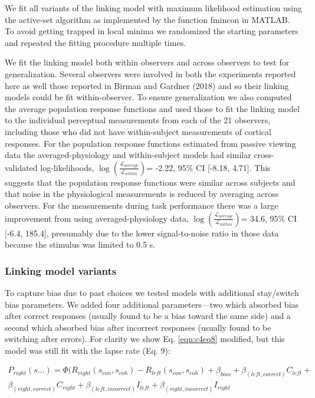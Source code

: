 \documentclass{report}
\begin{document}
We fit all variants of the linking model with maximum likelihood estimation using the active-set algorithm as implemented by the function fmincon in MATLAB. To avoid getting trapped in local minima we randomized the starting parameters and repeated the fitting procedure multiple times. 

We fit the linking model both within observers and across observers to test for generalization. Several observers were involved in both the experiments reported here as well those reported in Birman and Gardner (2018) and so their linking models could be fit within-observer. To ensure generalization we also computed the average population response functions and used those to fit the linking model to the individual perceptual measurements from each of the 21 observers, including those who did not have within-subject measurements of cortical responses. For the population response functions estimated from passive viewing data the averaged-physiology and within-subject models had similar cross-validated log-likelihoods, $\log(\frac{\mathcal{L}_{average}}{\mathcal{L}_{within}})$= -2.22, 95\% CI [-8.18, 4.71]. This suggests that the population response functions were similar across subjects and that noise in the physiological measurements is reduced by averaging across observers.  For the measurements during task performance there was a large improvement from using averaged-physiology data, $\log(\frac{\mathcal{L}_{average}}{\mathcal{L}_{within}})$= 34.6, 95\% CI [-6.4, 185.4], presumably due to the lower signal-to-noise ratio in those data because the stimulus was limited to 0.5 s.

\subsubsection{Linking model variants}

To capture bias due to past choices \citep{Abrahamyan2016-od,Frund2016-ld} we tested models with additional stay/switch bias parameters. We added four additional parameters—two which absorbed bias after correct responses (usually found to be a bias toward the same side) and a second which absorbed bias after incorrect responses (usually found to be switching after errors). For clarity we show Eq. \ref{eqn:c4eq8} modified, but this model was still fit with the lapse rate (Eq. 9):

\begin{equation}
    \begin{aligned}
    P_{right}(s...)=\Phi(R_{right}(s_{con},s_{coh})-R_{left}(s_{con},s_{coh})+\beta_{bias}+\beta_{(left,correct)}C_{left}+ \\ \beta_{(right,correct)}C_{right}+\beta_{(left,incorrect)}I_{left}+\beta_{(right,incorrect)}I_{right}
    \end{aligned}
\end{equation}
\end{document}
